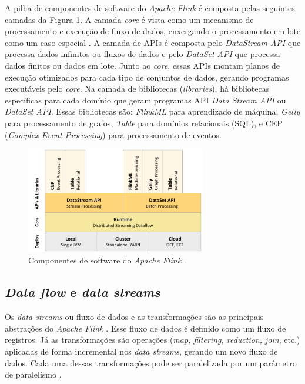 
A pilha de componentes de software do \emph{Apache Flink} é composta pelas
seguintes camadas da Figura \ref{fig:software-flink}.
A camada \emph{core} é vista como um mecanismo de processamento e execução de
fluxo de dados, enxergando o processamento em lote como um caso especial
\cite{Lopez2018,Carbone2015}.
A camada de APIs é composta pelo \emph{DataStream API} que processa dados
infinitos ou fluxos de dados e pelo \emph{DataSet API} que processa dados
finitos ou dados em lote.
Junto ao \emph{core}, essas APIs montam planos de execução otimizados para cada
tipo de conjuntos de dados, gerando programas executáveis pelo \emph{core}.
Na camada de bibliotecas (\emph{libraries}), há bibliotecas específicas para
cada domínio que geram programas API \emph{Data Stream API} ou \emph{DataSet
API}.
Essas bibliotecas são: \emph{FlinkML} para aprendizado de máquina, \emph{Gelly}
para processamento de grafos, \emph{Table} para domínios relacionais (SQL), e
CEP (\emph{Complex Event Processing}) para processamento de eventos.

\begin{figure}[ht]
\centering
\includegraphics[width=0.7\textwidth]{figuras/software-flink.png}
\caption{Componentes de software do \emph{Apache Flink} \cite{Carbone2015}.}
\label{fig:software-flink}
\end{figure}

\subsection{\emph{Data flow} e \emph{data streams}}

Os \emph{data streams} ou fluxo de dados e as transformações são as principais
abstrações do \emph{Apache Flink} \cite{Lopez2018,ApacheFlink2020}.
Esse fluxo de dados é definido como um fluxo de registros.
Já as transformações são operações (\emph{map, filtering, reduction, join},
etc.) aplicadas de forma incremental nos \emph{data streams}, gerando um novo
fluxo de dados.
Cada uma dessas transformações pode ser paralelizada por um parâmetro de
paralelismo \cite{Lopez2018}.

